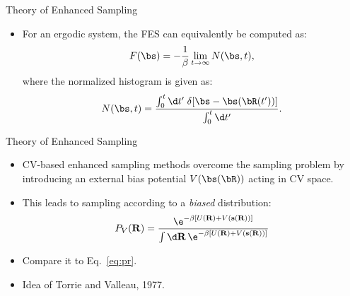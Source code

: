 \documentclass[10pt]{beamer}
\begin{document}
\begin{frame}{Theory of Enhanced Sampling}
\begin{itemize}
\setlength\itemsep{1em}
  \item For an ergodic system, the FES can equivalently be computed as:
  \begin{equation}
    F(\bs) = -\frac{1}{\beta} \lim_{t\rightarrow\infty} N(\bs, t),
  \end{equation}
  where the normalized histogram is given as:
  \begin{equation}
    N(\bs,t) = \frac{\int_0^t \d t'\; \delta[\bs-\bs(\bR(t'))]}{\int_0^t \d t'}.
  \end{equation}
\end{itemize}
\end{frame}

\begin{frame}{Theory of Enhanced Sampling}
\begin{itemize}
\setlength\itemsep{1em}
  \item CV-based enhanced sampling methods overcome the sampling problem by introducing an external bias potential $V(\bs(\bR))$ acting in CV space.

  \item This leads to sampling according to a \textit{biased} distribution:
  \begin{equation}
    P_{V}(\mathbf{R}) = \frac{\e^{-\beta \left[U(\mathbf{R})+V(\mathbf{s}(\mathbf{R})) \right]}}{\int \d\mathbf{R} \,\e^{-\beta \left[U(\mathbf{R})+V(\mathbf{s}(\mathbf{R})) \right]}}
  \end{equation}

  \item Compare it to Eq.~\ref{eq:pr}.

  \item Idea of Torrie and Valleau, 1977.
\end{itemize}
\end{frame}
\end{document}
